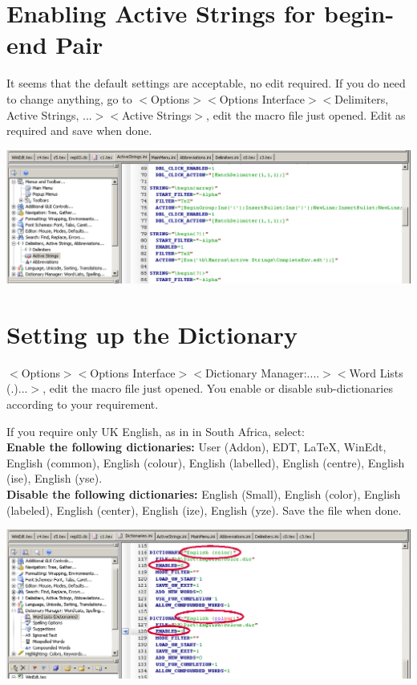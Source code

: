 \section{Enabling Active Strings for  begin-end Pair}
It seems that the default settings are acceptable, no edit required. If you do need to change anything, go to
$<$Options$>$$<$Options Interface$>$$<$Delimiters, Active Strings, ...$>$$<$Active Strings$>$, edit the macro file just opened. Edit as required and save when done.

\centerline{\includegraphics[bb= 0 0 1047 346, width=\textwidth]{eps/ASbegin.png}}



\section{Setting up the Dictionary}
$<$Options$>$$<$Options Interface$>$$<$Dictionary Manager:....$>$$<$Word Lists (.)...$>$, edit the macro file just opened.  You enable or disable
sub-dictionaries according to your requirement.

If you require only UK English, as in in South Africa, select:\\
\textbf{Enable the following dictionaries:} User (Addon), EDT, LaTeX, WinEdt, English (common),  English (colour),  English (labelled),  English (centre), English (ise),  English  (yse).\\
\textbf{Disable the following dictionaries:}  English (Small), English (color), English (labeled), English (center), English (ize), English (yze). 
Save the file when done.

\centerline{\includegraphics[bb= 0 0 1047 386, width=\textwidth]{eps/dictionary.png}}

